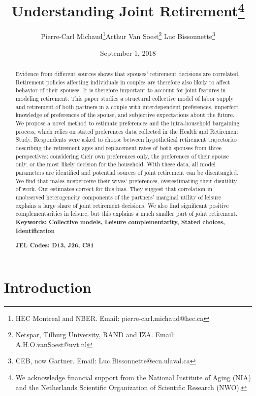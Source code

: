\documentclass[11pt,letter]{article}
\title{Understanding Joint Retirement\footnote{We acknowledge financial support from the National Institute of Aging (NIA) and the Netherlands Scientific Organization of Scientific Research (NWO).}}
\author{Pierre-Carl Michaud\thanks{HEC Montreal and NBER. Email: pierre-carl.michaud@hec.ca}\qquad Arthur Van Soest\thanks{Netspar, Tilburg University, RAND and IZA. Email: A.H.O.vanSoest@uvt.nl} \qquad Luc Bissonnette\thanks{CEB, now Gartner. Email: Luc.Bissonnette@ecn.ulaval.ca}}
\date{September 1, 2018}
\renewcommand{\thefootnote}{\fnsymbol{footnote}}
\begin{document}
\maketitle
\onehalfspacing

\begin{abstract}
Evidence from different sources shows that spouses' retirement decisions are correlated. Retirement policies affecting individuals in couples are therefore also likely to affect behavior of their spouses. It is therefore important to account for joint features in modeling retirement. This paper studies a structural collective model of labor supply and retirement of both partners in a couple with interdependent preferences, imperfect knowledge of preferences of the spouse, and subjective expectations about the future. We propose a novel method to estimate preferences and the intra-household bargaining process, which relies on stated preferences data collected in the Health and Retirement Study. Respondents were asked to choose between hypothetical retirement trajectories describing the retirement ages and replacement rates of both spouses from three perspectives: considering their own preferences only, the preferences of their spouse only, or the most likely decision for the household. With these data, all model parameters are identified and potential sources of joint retirement can be disentangled. We find that males misperceive their wives' preferences, overestimating their disutility of work. Our estimates correct for this bias. They suggest that correlation in unobserved heterogeneity components of the partners' marginal utility of leisure explains a large share of joint retirement decisions. We also find significant positive complementarities in leisure, but this explains a much smaller part of joint retirement.\\

\setlength{\parindent}{0cm}
\textbf{Keywords:  Collective models, Leisure complementarity, Stated choices, Identification }

\par \textbf{JEL Codes:  D13, J26, C81}

\end{abstract}

\doublespacing
\renewcommand{\thefootnote}{\arabic{footnote}}


\newpage
\section{Introduction}
\end{document}

